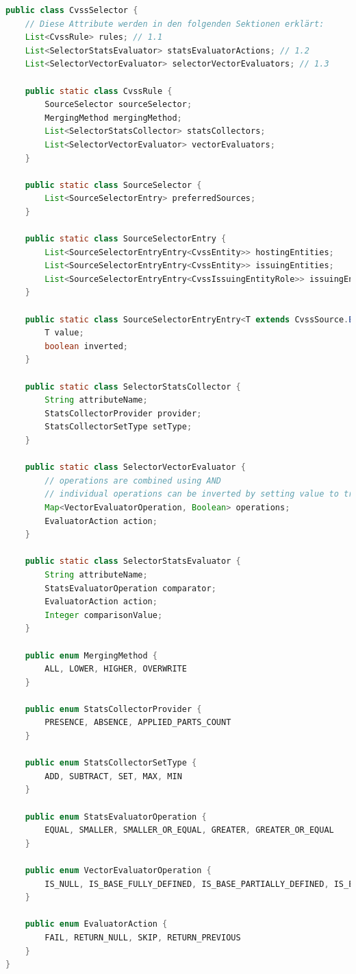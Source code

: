 \begin{lstlisting}[language=Java, label={lst:cvss-selector-class-attributes}, caption={CVSS-Selektor Klassen}]
public class CvssSelector {
    // Diese Attribute werden in den folgenden Sektionen erklärt:
    List<CvssRule> rules; // 1.1
    List<SelectorStatsEvaluator> statsEvaluatorActions; // 1.2
    List<SelectorVectorEvaluator> selectorVectorEvaluators; // 1.3

    public static class CvssRule {
        SourceSelector sourceSelector;
        MergingMethod mergingMethod;
        List<SelectorStatsCollector> statsCollectors;
        List<SelectorVectorEvaluator> vectorEvaluators;
    }

    public static class SourceSelector {
        List<SourceSelectorEntry> preferredSources;
    }

    public static class SourceSelectorEntry {
        List<SourceSelectorEntryEntry<CvssEntity>> hostingEntities;
        List<SourceSelectorEntryEntry<CvssEntity>> issuingEntities;
        List<SourceSelectorEntryEntry<CvssIssuingEntityRole>> issuingEntityRoles;
    }

    public static class SourceSelectorEntryEntry<T extends CvssSource.EntityNameProvider> {
        T value;
        boolean inverted;
    }

    public static class SelectorStatsCollector {
        String attributeName;
        StatsCollectorProvider provider;
        StatsCollectorSetType setType;
    }

    public static class SelectorVectorEvaluator {
        // operations are combined using AND
        // individual operations can be inverted by setting value to true
        Map<VectorEvaluatorOperation, Boolean> operations;
        EvaluatorAction action;
    }

    public static class SelectorStatsEvaluator {
        String attributeName;
        StatsEvaluatorOperation comparator;
        EvaluatorAction action;
        Integer comparisonValue;
    }

    public enum MergingMethod {
        ALL, LOWER, HIGHER, OVERWRITE
    }

    public enum StatsCollectorProvider {
        PRESENCE, ABSENCE, APPLIED_PARTS_COUNT
    }

    public enum StatsCollectorSetType {
        ADD, SUBTRACT, SET, MAX, MIN
    }

    public enum StatsEvaluatorOperation {
        EQUAL, SMALLER, SMALLER_OR_EQUAL, GREATER, GREATER_OR_EQUAL
    }

    public enum VectorEvaluatorOperation {
        IS_NULL, IS_BASE_FULLY_DEFINED, IS_BASE_PARTIALLY_DEFINED, IS_ENVIRONMENTAL_PARTIALLY_DEFINED, IS_TEMPORAL_PARTIALLY_DEFINED, IS_THREAT_PARTIALLY_DEFINED
    }

    public enum EvaluatorAction {
        FAIL, RETURN_NULL, SKIP, RETURN_PREVIOUS
    }
}
\end{lstlisting}

